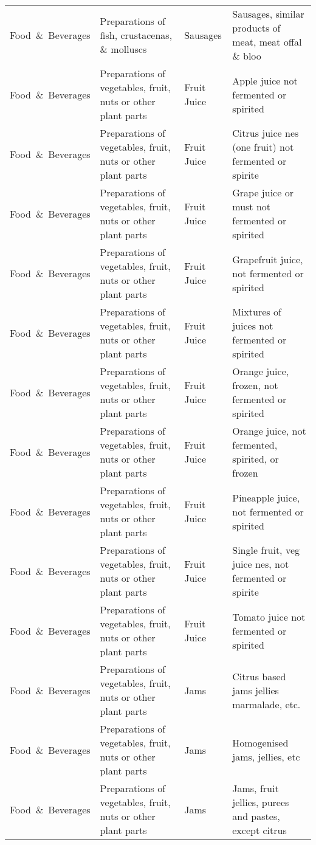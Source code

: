 \begin{appendices}
\begin{xltabular}{\textwidth}{|p{0.10\textwidth}|p{0.30\textwidth}|p{0.20\textwidth}|p{0.30\textwidth}|}
		Food\ \&\ Beverages & Preparations of fish, crustacenas, \& molluscs & Sausages & Sausages, similar products of meat, meat offal \& bloo \\
		Food\ \&\ Beverages & Preparations of vegetables, fruit, nuts or other plant parts & Fruit Juice & Apple juice not fermented or spirited \\
		Food\ \&\ Beverages & Preparations of vegetables, fruit, nuts or other plant parts & Fruit Juice & Citrus juice nes (one fruit) not fermented or spirite \\
		Food\ \&\ Beverages & Preparations of vegetables, fruit, nuts or other plant parts & Fruit Juice & Grape juice or must not fermented or spirited \\
		Food\ \&\ Beverages & Preparations of vegetables, fruit, nuts or other plant parts & Fruit Juice & Grapefruit juice, not fermented or spirited \\
		Food\ \&\ Beverages & Preparations of vegetables, fruit, nuts or other plant parts & Fruit Juice & Mixtures of juices not fermented or spirited \\
		Food\ \&\ Beverages & Preparations of vegetables, fruit, nuts or other plant parts & Fruit Juice & Orange juice, frozen, not fermented or spirited \\
		Food\ \&\ Beverages & Preparations of vegetables, fruit, nuts or other plant parts & Fruit Juice & Orange juice, not fermented, spirited, or frozen \\
		Food\ \&\ Beverages & Preparations of vegetables, fruit, nuts or other plant parts & Fruit Juice & Pineapple juice, not fermented or spirited \\
		Food\ \&\ Beverages & Preparations of vegetables, fruit, nuts or other plant parts & Fruit Juice & Single fruit, veg juice nes, not fermented or spirite \\
		Food\ \&\ Beverages & Preparations of vegetables, fruit, nuts or other plant parts & Fruit Juice & Tomato juice not fermented or spirited \\
		Food\ \&\ Beverages & Preparations of vegetables, fruit, nuts or other plant parts & Jams & Citrus based jams jellies marmalade, etc. \\
		Food\ \&\ Beverages & Preparations of vegetables, fruit, nuts or other plant parts & Jams & Homogenised jams, jellies, etc \\
		Food\ \&\ Beverages & Preparations of vegetables, fruit, nuts or other plant parts & Jams & Jams, fruit jellies, purees and pastes, except citrus \\

\end{xltabular}
\end{appendices}
